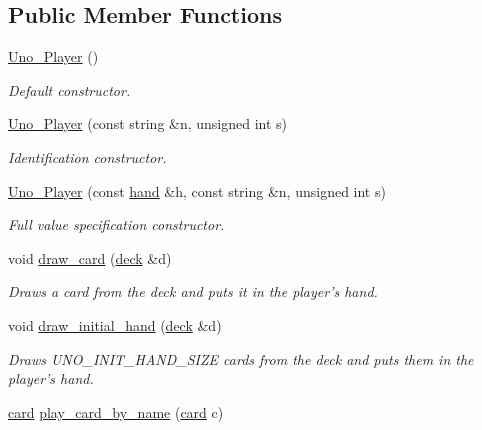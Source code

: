 \subsection*{\-Public \-Member \-Functions}
\begin{DoxyCompactItemize}
\item 
\hyperlink{class_uno___player_a0447ff92b80be8d98d0052d7d2a868d7}{\-Uno\-\_\-\-Player} ()
\begin{DoxyCompactList}\small\item\em \-Default constructor. \end{DoxyCompactList}\item 
\hyperlink{class_uno___player_a01b27e59f1de1e13627c2e72e69c65c6}{\-Uno\-\_\-\-Player} (const string \&n, unsigned int s)
\begin{DoxyCompactList}\small\item\em \-Identification constructor. \end{DoxyCompactList}\item 
\hyperlink{class_uno___player_acd18cd073963d561da37018f114ef29b}{\-Uno\-\_\-\-Player} (const \hyperlink{uno__player_8h_acd9523c15e47a87e3740cf5ade73556e}{hand} \&h, const string \&n, unsigned int s)
\begin{DoxyCompactList}\small\item\em \-Full value specification constructor. \end{DoxyCompactList}\item 
void \hyperlink{class_uno___player_ac803ffaaf0efeaa27d3d4993545bee39}{draw\-\_\-card} (\hyperlink{uno__deck_8h_ab634a15f4d19d3af113a71241b79c408}{deck} \&d)
\begin{DoxyCompactList}\small\item\em \-Draws a card from the deck and puts it in the player's hand. \end{DoxyCompactList}\item 
void \hyperlink{class_uno___player_a5f0d9630e8e143f34c4d63340bac90e0}{draw\-\_\-initial\-\_\-hand} (\hyperlink{uno__deck_8h_ab634a15f4d19d3af113a71241b79c408}{deck} \&d)
\begin{DoxyCompactList}\small\item\em \-Draws \-U\-N\-O\-\_\-\-I\-N\-I\-T\-\_\-\-H\-A\-N\-D\-\_\-\-S\-I\-Z\-E cards from the deck and puts them in the player's hand. \end{DoxyCompactList}\item 
\hyperlink{uno__card_8h_ab16a632e2e3f1f154cce75648902eb83}{card} \hyperlink{class_uno___player_a2e94c703cf4f680c4dcbcb1adbb4816b}{play\-\_\-card\-\_\-by\-\_\-name} (\hyperlink{uno__card_8h_ab16a632e2e3f1f154cce75648902eb83}{card} c)

\end{DoxyCompactItemize}

